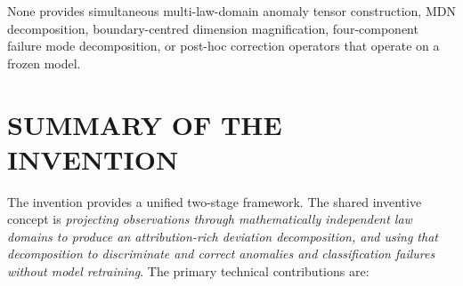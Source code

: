 \documentclass[12pt,a4paper]{article}
\begin{document}
None provides simultaneous multi-law-domain anomaly tensor construction,
MDN decomposition, boundary-centred dimension magnification, four-component
failure mode decomposition, or post-hoc correction operators that operate
on a frozen model.

\section{SUMMARY OF THE INVENTION}

The invention provides a unified two-stage framework. The shared inventive
concept is \emph{projecting observations through mathematically independent
law domains to produce an attribution-rich deviation decomposition, and
using that decomposition to discriminate and correct anomalies and
classification failures without model retraining}. The primary technical
contributions are:
\end{document}
